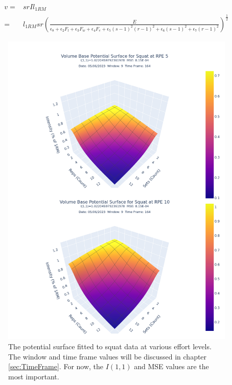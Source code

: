 \begin{equation}
    \label{eq:VolumeBaseIntensitySubedInVolume}
    \begin{split}
    		v = & srI l_{1RM} \\
    			= & l_{1RM} sr \left( 
    			\frac{
    				E
    			}{
    				\epsilon_8+
    				\epsilon_2 F_l+
    				\epsilon_3 F_w+
    				\epsilon_4 F_e+
    				\epsilon_5 (s-1)^2(r-1)^2+
    				\epsilon_6 (s-1)^2+
    				\epsilon_7 (r-1)^2
    			}
    		\right)^{\frac{1}{2}}
    \end{split}
\end{equation}

\begin{figure}[htbp]
    \centering
    \includegraphics[scale=0.55]{images/ch3/PotentialSurface/DualSquat.Effort[5,10].volumeBase.png}
    \caption{The potential surface fitted to squat data at various effort levels. The window and time frame values will be discussed in chapter \ref{sec:TimeFrame}. For now, the $I(1,1)$ and MSE values are the most important.}
    \label{fig:VolumeBaseSquatPotentialSurfaceAcrossEffort}
\end{figure}

